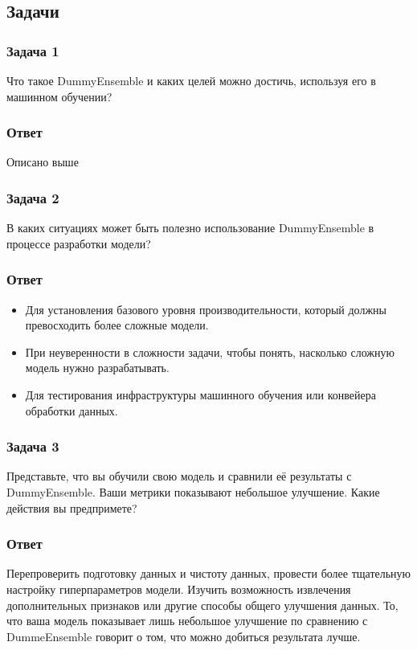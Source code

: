 \subsection*{Задачи}
\subsubsection*{Задача 1}
    Что такое DummyEnsemble и каких целей можно достичь, используя его в машинном обучении? 
\subsubsection*{Ответ}
    Описано выше
\subsubsection*{Задача 2}
    В каких ситуациях может быть полезно использование DummyEnsemble в процессе разработки модели?
\subsubsection*{Ответ}
\begin{itemize}
    \item Для установления базового уровня производительности, который должны превосходить более сложные модели.
    \item При неуверенности в сложности задачи, чтобы понять, насколько сложную модель нужно разрабатывать.
    \item Для тестирования инфраструктуры машинного обучения или конвейера обработки данных.
\end{itemize}
\subsubsection*{Задача 3}
    Представьте, что вы обучили свою модель и сравнили её результаты с DummyEnsemble. Ваши метрики показывают небольшое улучшение. Какие действия вы предпримете?
\subsubsection*{Ответ}
    Перепроверить подготовку данных и чистоту данных, провести более тщательную настройку гиперпараметров модели. Изучить возможность извлечения дополнительных признаков или другие способы общего улучшения данных. То, что ваша модель показывает лишь небольшое улучшение по сравнению с DummeEnsemble говорит о том, что можно добиться результата лучше.
